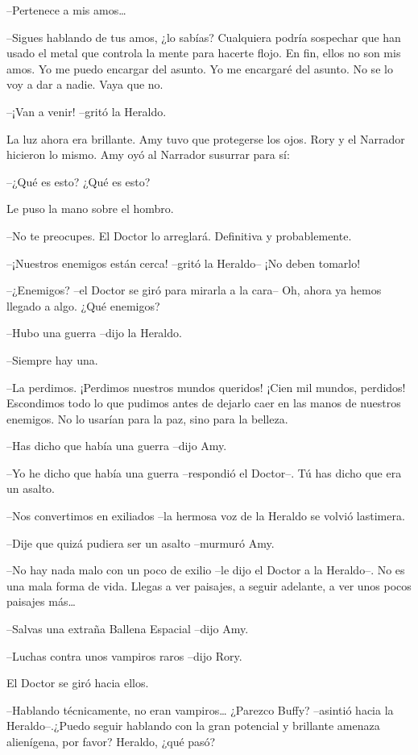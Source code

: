 {--Pertenece a mis amos\ldots{}}

{--Sigues hablando de tus amos, ¿lo sabías? Cualquiera podría
	sospechar que han usado el metal que controla la mente para hacerte
	flojo. En fin, ellos no son mis amos. Yo me puedo encargar del asunto.
Yo me encargaré del asunto. No se lo voy a dar a nadie. Vaya que no.}

{--¡Van a venir! --gritó la Heraldo.}

{La luz ahora era brillante. Amy tuvo que protegerse los ojos. Rory y el
Narrador hicieron lo mismo. Amy oyó al Narrador susurrar para sí:}

{--¿Qué es esto? ¿Qué es esto?}

{Le puso la mano sobre el hombro.}

{--No te preocupes. El Doctor lo arreglará. Definitiva y
probablemente.}

{--¡Nuestros enemigos están cerca! --gritó la Heraldo-- ¡No deben
tomarlo!}

{--¿Enemigos? --el Doctor se giró para mirarla a la cara-- Oh, ahora
ya hemos llegado a algo. ¿Qué enemigos?}

{--Hubo una guerra --dijo la Heraldo.}

{--Siempre hay una.}

{--La perdimos. ¡Perdimos nuestros mundos queridos! ¡Cien mil mundos,
	perdidos! Escondimos todo lo que pudimos antes de dejarlo caer en las
	manos de nuestros enemigos. No lo usarían para la paz, sino para la
belleza.}

{--Has dicho que había una guerra --dijo Amy.}

{--Yo he dicho que había una guerra --respondió el Doctor--. Tú has
dicho que era un asalto.}

{--Nos convertimos en exiliados --la hermosa voz de la Heraldo se
volvió lastimera.}

{--Dije que quizá pudiera ser un asalto --murmuró Amy.}

{--No hay nada malo con un poco de exilio --le dijo el Doctor a la
	Heraldo--. No es una mala forma de vida. Llegas a ver paisajes, a seguir
	adelante, a ver unos pocos paisajes más\ldots{}}

{--Salvas una extraña Ballena Espacial --dijo Amy.}

{--Luchas contra unos vampiros raros --dijo Rory.}

{El Doctor se giró hacia ellos.}

{--Hablando técnicamente, no eran vampiros\ldots{} ¿Parezco Buffy?
	--asintió hacia la Heraldo--.¿Puedo seguir hablando con la gran
	potencial y brillante amenaza alienígena, por favor? Heraldo, ¿qué
pasó?}

